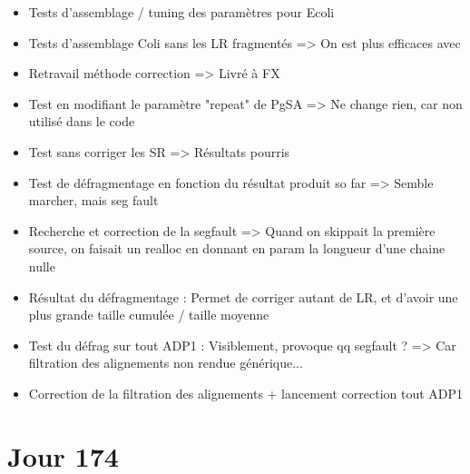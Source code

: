 \documentclass[12pt]{report}
\begin{document}
\begin{itemize}
	\item Tests d'assemblage / tuning des paramètres pour Ecoli
	
	\item Tests d'assemblage Coli sans les LR fragmentés => On est plus efficaces avec
	
	\item Retravail méthode correction => Livré à FX
	
	\item Test en modifiant le paramètre "repeat" de PgSA => Ne change rien, car non utilisé dans le code
	
	\item Test sans corriger les SR => Résultats pourris
	
	\item Test de défragmentage en fonction du résultat produit so far => Semble marcher, mais seg fault
	
	\item Recherche et correction de la segfault => Quand on skippait la première source, on faisait un realloc en donnant en param
		  la longueur d'une chaine nulle
		  
	\item Résultat du défragmentage : Permet de corriger autant de LR, et d'avoir une plus grande taille cumulée / taille moyenne
	
	\item Test du défrag sur tout ADP1 : Visiblement, provoque qq segfault ? => Car filtration des alignements non rendue générique...
	
	\item Correction de la filtration des alignements + lancement correction tout ADP1
\end{itemize}

\section{Jour 174}
\end{document}
